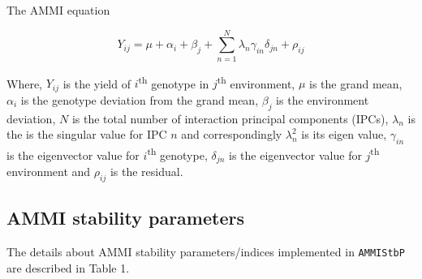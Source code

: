 \documentclass[]{article}
\begin{document}
The AMMI equation

\[Y_{ij} = \mu + \alpha_{i} + \beta_{j} + \sum_{n=1}^{N}\lambda_{n}\gamma_{in}\delta_{jn} + \rho_{ij}\]

Where, \(Y_{ij}\) is the yield of \(i\)\textsuperscript{th} genotype in
\(j\)\textsuperscript{th} environment, \(\mu\) is the grand mean,
\(\alpha_{i}\) is the genotype deviation from the grand mean,
\(\beta_{j}\) is the environment deviation, \(N\) is the total number of
interaction principal components (IPCs), \(\lambda_{n}\) is the is the
singular value for IPC \(n\) and correspondingly \(\lambda_{n}^{2}\) is
its eigen value, \(\gamma_{in}\) is the eigenvector value for
\(i\)\textsuperscript{th} genotype, \(\delta_{jn}\) is the eigenvector
value for \(j\)\textsuperscript{th} environment and \(\rho_{ij}\) is the
residual.

\hypertarget{ammi-stability-parameters}{%
\subsection{AMMI stability parameters}\label{ammi-stability-parameters}}

The details about AMMI stability parameters/indices implemented in
\texttt{AMMIStbP} are described in Table 1.
\end{document}
